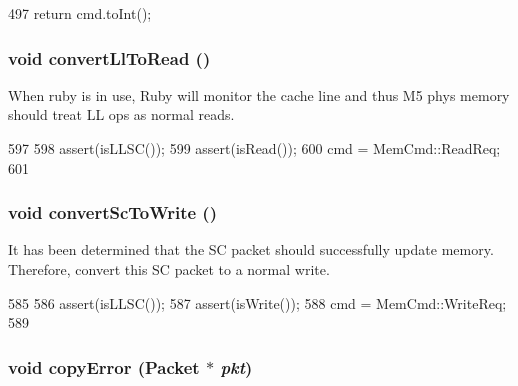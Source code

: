 \begin{DoxyCode}
497 { return cmd.toInt(); }
\end{DoxyCode}
\hypertarget{classPacket_a4d3d1abff83d841c66d318d026a5d58e}{
\subsubsection[{convertLlToRead}]{\setlength{\rightskip}{0pt plus 5cm}void convertLlToRead ()}}
\label{classPacket_a4d3d1abff83d841c66d318d026a5d58e}
When ruby is in use, Ruby will monitor the cache line and thus M5 phys memory should treat LL ops as normal reads. 


\begin{DoxyCode}
597     {
598         assert(isLLSC());
599         assert(isRead());
600         cmd = MemCmd::ReadReq;
601     }
\end{DoxyCode}
\hypertarget{classPacket_ac4dec10b288f4bdc07dd66688b81f832}{
\subsubsection[{convertScToWrite}]{\setlength{\rightskip}{0pt plus 5cm}void convertScToWrite ()}}
\label{classPacket_ac4dec10b288f4bdc07dd66688b81f832}
It has been determined that the SC packet should successfully update memory. Therefore, convert this SC packet to a normal write. 


\begin{DoxyCode}
585     {
586         assert(isLLSC());
587         assert(isWrite());
588         cmd = MemCmd::WriteReq;
589     }
\end{DoxyCode}
\hypertarget{classPacket_a838dc8f424eaa81aa7ee30fb4c5900a0}{
\subsubsection[{copyError}]{\setlength{\rightskip}{0pt plus 5cm}void copyError ({\bf Packet} $\ast$ {\em pkt})}}
\label{classPacket_a838dc8f424eaa81aa7ee30fb4c5900a0}



